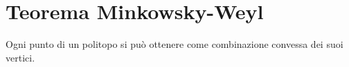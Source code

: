 \documentclass[\main/main.tex]{subfiles}
\begin{document}
\section{Teorema Minkowsky-Weyl}
\begin{theorem}
  Ogni punto di un politopo si può ottenere come combinazione convessa dei suoi vertici.
\end{theorem}
\end{document}
